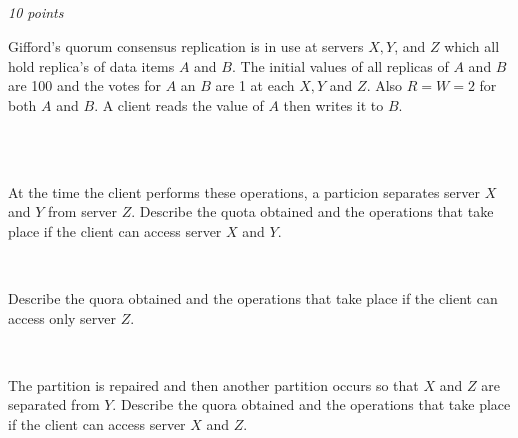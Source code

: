 \documentclass[a4paper]{article}
\newcommand{\points}[1]{\subsection{} \textit{#1 points}\\}
\newcommand{\question}[2][]{
  \parbox[t]{\textwidth}{
    \ifthenelse{\equal{#1}{}}{}{#1)}
    \parbox[t]{0.95\textwidth}{#2}}\\}
\begin{document}
\points{10}
\question{Gifford's quorum consensus replication is in use
  at servers $X, Y$, and $Z$ which all hold replica's of data items $A$
  and $B$. The initial values of all replicas of $A$ and $B$ are 100 and
  the votes for $A$ an $B$ are 1 at each $X, Y$ and $Z$. Also $R=W=2$
  for both $A$ and $B$. A client reads the value of $A$ then writes it
  to $B$.}\\
\question[a]{At the time the client performs these
  operations, a particion separates server $X$ and $Y$ from server
  $Z$. Describe the quota obtained and the operations that take place if
  the client can access server $X$ and $Y$.}
\question[b]{Describe the quora obtained and the operations that take
  place if the client can access only server $Z$.}
\question[c]{The partition is repaired and then another partition
  occurs so that $X$ and $Z$ are separated from $Y$. Describe the
  quora obtained and the operations that take place if the client can
  access server $X$ and $Z$.}
\end{document}

